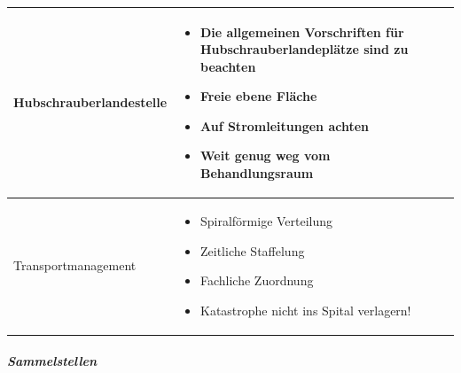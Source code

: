 \documentclass{article}
\begin{document}
\begin{center}
\begin{supertabular}{|m{2.365cm}m{5.8640003cm}m{4.8710003cm}|}
\\\hline
{\mdseries\color{black} Hubschrauber\-landestelle}

 &
\begin{itemize}
\item {\mdseries Die allgemeinen Vorschriften f\"ur
Hubschrauberlandepl\"atze sind zu beachten}

\item {\mdseries Freie ebene Fl\"ache }

\item {\mdseries Auf Stromleitungen achten}

\item {\mdseries Weit genug weg vom Behandlungsraum }

\end{itemize}
 &
{\par}

\\\hline
{\mdseries\color{black} Transport\-management}

 &
\begin{itemize}
\item {\mdseries Spiralf\"ormige Verteilung}

\item {\mdseries Zeitliche Staffelung}

\item {\mdseries Fachliche Zuordnung}

\item {\mdseries Katastrophe nicht ins Spital verlagern!}

\end{itemize}
 &
{%
 \par}

\\\hline
\end{supertabular}
\end{center}
\subparagraph{Sammelstellen}
\end{document}
